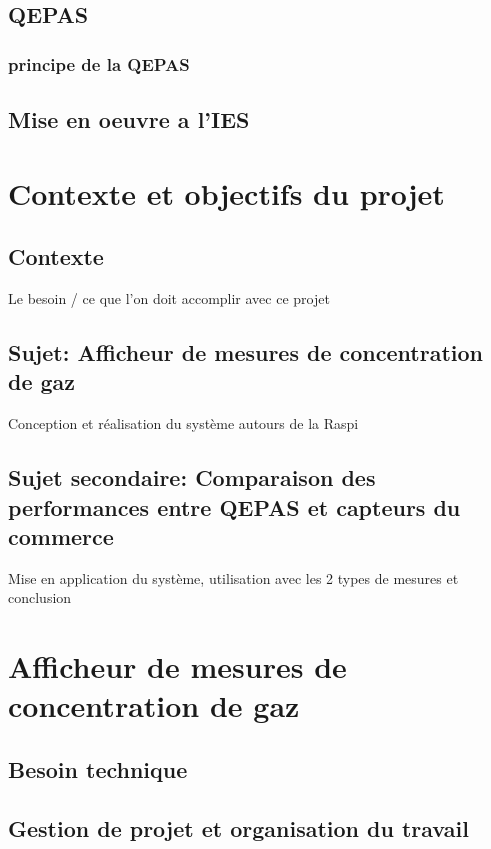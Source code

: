 \documentclass[a4paper]{report}
\begin{document}
	\section{QEPAS}
		\subsection{principe de la QEPAS}
			
	\section{Mise en oeuvre a l'IES}

	\chapter{Contexte et objectifs du projet}

	
	\section{Contexte}
	Le besoin / ce que l'on doit accomplir avec ce projet
	
	\section{Sujet: Afficheur de mesures de concentration de gaz}
	Conception et réalisation du système autours de la Raspi
		
	\section{Sujet secondaire: Comparaison des performances entre QEPAS et capteurs du commerce}
	Mise en application du système, utilisation avec les 2 types de mesures et conclusion
	
	\chapter{Afficheur de mesures de concentration de gaz}
	
	
	\section{Besoin technique}
	
	\section{Gestion de projet et organisation du travail}
	
\end{document}
